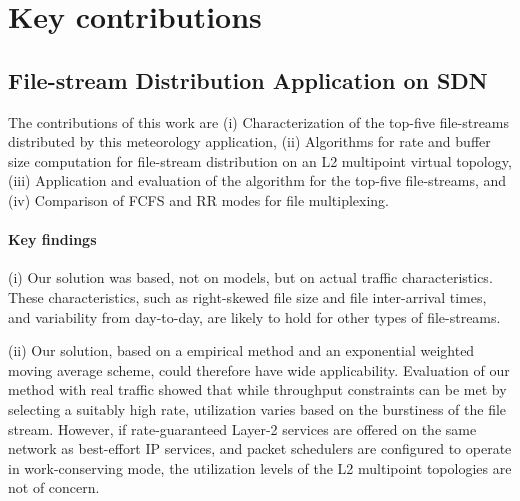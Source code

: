


\section{Key contributions}
\subsection{File-stream Distribution Application on SDN}
The contributions of this work are (i) Characterization of the top-five file-streams distributed by this meteorology application, (ii) Algorithms for rate and buffer size computation for
file-stream distribution on an L2 multipoint virtual topology, (iii) Application and evaluation of the algorithm for the top-five file-streams, and (iv) Comparison of FCFS and RR modes for file multiplexing.

\paragraph{Key findings}
(i) Our solution was based, not
on models, but on actual traffic characteristics. These
characteristics, such as right-skewed file size and file
inter-arrival times, and variability from day-to-day,
are likely to hold for other types of file-streams.

(ii) Our solution, based on a empirical method and an exponential weighted moving average scheme, could therefore have wide applicability.
Evaluation of our method with real traffic showed that
while throughput constraints can be met by selecting a suitably high
rate, utilization varies based on the burstiness of the file stream.
However, if rate-guaranteed Layer-2 services are offered
on the same network as best-effort IP services, and packet schedulers
are configured to operate in work-conserving mode, the utilization levels
of the L2 multipoint topologies are not of concern. 

